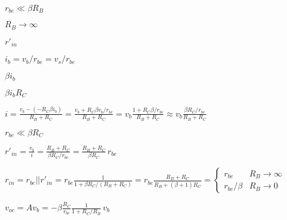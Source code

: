 \documentclass{article}
\def\lthtmlcheckvsize{\ifdim\ht\sizebox<\vsize 
  \ifdim\wd\sizebox<\hsize\expandafter\hfill\fi \expandafter\vfill
  \else\expandafter\vss\fi}%
\begin{document}
{\newpage\clearpage
{}%
$ r_{be}\ll \beta R_B$%
\lthtmlindisplaymathZ
\lthtmlcheckvsize\clearpage}

{\newpage\clearpage
{}%
$ R_B\rightarrow\infty$%
\lthtmlindisplaymathZ
\lthtmlcheckvsize\clearpage}

{\newpage\clearpage
{}%
$ r'_{in}$%
\lthtmlindisplaymathZ
\lthtmlcheckvsize\clearpage}

{\newpage\clearpage
{}%
$ i_b=v_b/r_{be}=v_s/r_{be}$%
\lthtmlindisplaymathZ
\lthtmlcheckvsize\clearpage}

{\newpage\clearpage
{}%
$ \beta i_b$%
\lthtmlindisplaymathZ
\lthtmlcheckvsize\clearpage}

{\newpage\clearpage
{}%
$ \beta i_bR_C$%
\lthtmlindisplaymathZ
\lthtmlcheckvsize\clearpage}

{\newpage\clearpage
{}%
$\displaystyle i=\frac{v_b-(-R_C\beta i_b)}{R_B+R_C}=\frac{v_b+R_C \beta v_b/r_{be}}{R_B+R_C}
=v_b \frac{1+R_C \beta /r_{be}}{R_B+R_C}
\approx v_b \frac{\beta R_C /r_{be}}{R_B+R_C}$%
\lthtmlindisplaymathZ
\lthtmlcheckvsize\clearpage}

{\newpage\clearpage
{}%
$ r_{be}\ll \beta R_C$%
\lthtmlindisplaymathZ
\lthtmlcheckvsize\clearpage}

{\newpage\clearpage
{}%
$\displaystyle r'_{in}=\frac{v_b}{i}
=\frac{R_B+R_C}{\beta R_C /r_{be}}=\frac{R_B+R_C}{\beta R_C}\,r_{be}$%
\lthtmlindisplaymathZ
\lthtmlcheckvsize\clearpage}

{\newpage\clearpage
{}%
$\displaystyle r_{in}=r_{be}||r'_{in}=r_{be}\frac{1}{1+\beta R_C/(R_B+R_C)}
=r_{be}\frac{R_B+R_C}{R_B+(\beta+1) R_C}
=\left\{\begin{array}{ll} r_{be} & R_B\rightarrow\infty\\
r_{be}/\beta & R_B\rightarrow 0\end{array}\right.$%
\lthtmlindisplaymathZ
\lthtmlcheckvsize\clearpage}

{\newpage\clearpage
{}%
$\displaystyle v_{oc}=A v_b=-\beta\frac{R_C}{r_{be}}\frac{1}{1+R_C/R_B}\,v_b$%
\lthtmlindisplaymathZ
\lthtmlcheckvsize\clearpage}
\end{document}
